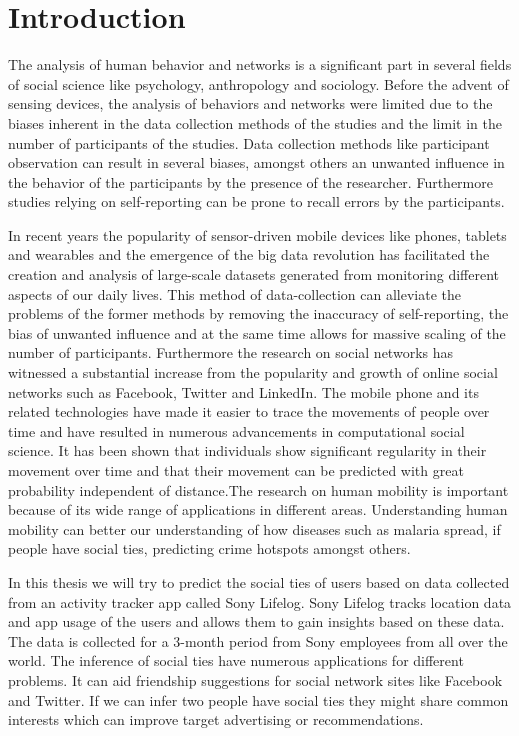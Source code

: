 \chapter{Introduction}
\label{chap:Introduction}

The analysis of human behavior and networks is a significant part in several fields of social science like psychology, anthropology and sociology. Before the advent of sensing devices, the analysis of behaviors and networks were limited due to the biases inherent in the data collection methods of the studies and the limit in the number of participants of the studies. Data collection methods like participant observation can result in several biases, amongst others an unwanted influence in the behavior of the participants by the presence of the researcher\cite{rosenthal1966experimenter}. Furthermore studies relying on self-reporting can be prone to recall errors by the participants\cite{stone1999science}\cite{bernard1980informant}.

In recent years the popularity of sensor-driven mobile devices like phones, tablets and wearables and the emergence of the big data revolution has facilitated the creation and analysis of large-scale datasets generated from monitoring different aspects of our daily lives\cite{lazer2009life}. This method of data-collection can alleviate the problems of the former methods by removing the inaccuracy of self-reporting, the bias of unwanted influence and at the same time allows for massive scaling of the number of participants. Furthermore the research on social networks has witnessed a substantial increase from the popularity and growth of online social networks such as Facebook, Twitter and LinkedIn\cite{social_networks}. The mobile phone and its related technologies have made it easier to trace the movements of people over time and have resulted in numerous advancements in computational social science. It has been shown that individuals show significant regularity in their movement over time\cite{gonzalez2008understanding} and that their movement can be predicted with great probability independent of distance\cite{song2010limits}.The research on human mobility is important because of its wide range of applications in different areas. Understanding human mobility can better our understanding of how diseases such as malaria spread\cite{wesolowski2012quantifying}, if people have social ties\cite{crandall2010inferring}, predicting crime hotspots\cite{bogomolov2014once} amongst others.

In this thesis we will try to predict the social ties of users based on data collected from an activity tracker app called Sony Lifelog\cite{sonyLifeLog}. Sony Lifelog tracks location data and app usage of the users and allows them to gain insights based on these data. The data is collected for a 3-month period from Sony employees from all over the world.
The inference of social ties have numerous applications for different problems. It can aid friendship suggestions for social network sites like Facebook and Twitter. If we can infer two people have social ties they might share common interests which can improve target advertising or recommendations\cite{yu2015investigating}.


